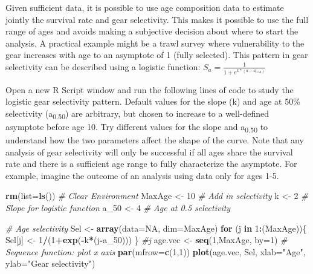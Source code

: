 \documentclass[
]{krantz}
\makeatletter
\newenvironment{Shaded}{\begin{snugshade}}{\end{snugshade}}
\newcommand{\AttributeTok}[1]{\textcolor[rgb]{0.27,0.27,0.27}{#1}}
\newcommand{\CommentTok}[1]{\textcolor[rgb]{0.37,0.37,0.37}{\textit{#1}}}
\newcommand{\ConstantTok}[1]{\textcolor[rgb]{0.37,0.37,0.37}{#1}}
\newcommand{\ControlFlowTok}[1]{\textcolor[rgb]{0.27,0.27,0.27}{\textbf{#1}}}
\newcommand{\DecValTok}[1]{\textcolor[rgb]{0.06,0.06,0.06}{#1}}
\newcommand{\FunctionTok}[1]{\textcolor[rgb]{0.27,0.27,0.27}{\textbf{#1}}}
\newcommand{\NormalTok}[1]{#1}
\newcommand{\OtherTok}[1]{\textcolor[rgb]{0.37,0.37,0.37}{#1}}
\newcommand{\SpecialCharTok}[1]{\textcolor[rgb]{0.43,0.43,0.43}{\textbf{#1}}}
\newcommand{\StringTok}[1]{\textcolor[rgb]{0.5,0.5,0.5}{#1}}
\newenvironment{kframe}{%
\medskip{}
\setlength{\fboxsep}{.8em}
 \def\at@end@of@kframe{}%
 \ifinner\ifhmode%
  \def\at@end@of@kframe{\end{minipage}}%
  \begin{minipage}{\columnwidth}%
 \fi\fi%
 \def\FrameCommand##1{\hskip\@totalleftmargin \hskip-\fboxsep
 \colorbox{shadecolor}{##1}\hskip-\fboxsep
     \hskip-\linewidth \hskip-\@totalleftmargin \hskip\columnwidth}%
 \MakeFramed {\advance\hsize-\width
   \@totalleftmargin\z@ \linewidth\hsize
   \@setminipage}}%
 {\par\unskip\endMakeFramed%
 \at@end@of@kframe}
\renewenvironment{Shaded}{\begin{kframe}}{\end{kframe}}
\makeatother
\begin{document}
Given sufficient data, it is possible to use age composition data to estimate jointly the survival rate and gear selectivity. This makes it possible to use the full range of ages and avoids making a subjective decision about where to start the analysis. A practical example might be a trawl survey where vulnerability to the gear increases with age to an asymptote of 1 (fully selected). This pattern in gear selectivity can be described using a logistic function: \(S_{a} = \frac{1}{1+e^{k*(a-a_{0.50})}}\)

Open a new R Script window and run the following lines of code to study the logistic gear selectivity pattern. Default values for the slope (k) and age at 50\% selectivity (a\textsubscript{0.50}) are arbitrary, but chosen to increase to a well-defined asymptote before age 10. Try different values for the slope and a\textsubscript{0.50} to understand how the two parameters affect the shape of the curve. Note that any analysis of gear selectivity will only be successful if all ages share the survival rate and there is a sufficient age range to fully characterize the asymptote. For example, imagine the outcome of an analysis using data only for ages 1-5.

\begin{Shaded}
\begin{Highlighting}[]
\FunctionTok{rm}\NormalTok{(}\AttributeTok{list=}\FunctionTok{ls}\NormalTok{()) }\CommentTok{\# Clear Environment}
\NormalTok{MaxAge }\OtherTok{\textless{}{-}} \DecValTok{10}
\CommentTok{\# Add in selectivity}
\NormalTok{k }\OtherTok{\textless{}{-}} \DecValTok{2} \CommentTok{\# Slope for logistic function}
\NormalTok{a\_50 }\OtherTok{\textless{}{-}} \DecValTok{4} \CommentTok{\# Age at 0.5 selectivity}

\CommentTok{\# Age selectivity}
\NormalTok{Sel }\OtherTok{\textless{}{-}} \FunctionTok{array}\NormalTok{(}\AttributeTok{data=}\ConstantTok{NA}\NormalTok{, }\AttributeTok{dim=}\NormalTok{MaxAge)}
\ControlFlowTok{for}\NormalTok{ (j }\ControlFlowTok{in} \DecValTok{1}\SpecialCharTok{:}\NormalTok{(MaxAge))\{}
\NormalTok{  Sel[j] }\OtherTok{\textless{}{-}} \DecValTok{1}\SpecialCharTok{/}\NormalTok{(}\DecValTok{1}\SpecialCharTok{+}\FunctionTok{exp}\NormalTok{(}\SpecialCharTok{{-}}\NormalTok{k}\SpecialCharTok{*}\NormalTok{(j}\SpecialCharTok{{-}}\NormalTok{a\_50)))}
\NormalTok{\} }\CommentTok{\#j}
\NormalTok{age.vec }\OtherTok{\textless{}{-}} \FunctionTok{seq}\NormalTok{(}\DecValTok{1}\NormalTok{,MaxAge, }\AttributeTok{by=}\DecValTok{1}\NormalTok{)  }\CommentTok{\# Sequence function: plot x axis}
\FunctionTok{par}\NormalTok{(}\AttributeTok{mfrow=}\FunctionTok{c}\NormalTok{(}\DecValTok{1}\NormalTok{,}\DecValTok{1}\NormalTok{))}
\FunctionTok{plot}\NormalTok{(age.vec, Sel, }\AttributeTok{xlab=}\StringTok{"Age"}\NormalTok{, }\AttributeTok{ylab=}\StringTok{"Gear selectivity"}\NormalTok{)}
\end{Highlighting}
\end{Shaded}
\end{document}
